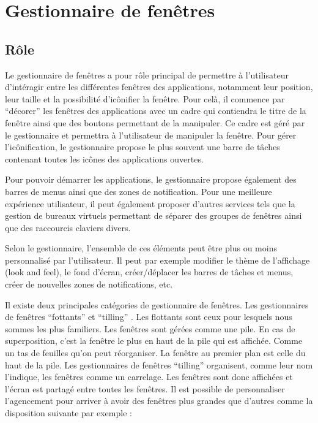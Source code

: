 \section{Gestionnaire de fenêtres}

\subsection{Rôle}

Le gestionnaire de fenêtres a pour rôle principal de permettre à l’utilisateur d’intéragir entre les différentes fenêtres des applications, notamment leur position, leur taille et la possibilité d’icônifier la fenêtre. Pour celà, il commence par “décorer” les fenêtres des applications avec un cadre qui contiendra le titre de la fenêtre ainsi que des boutons permettant de la manipuler. Ce cadre est géré par le gestionnaire et permettra à l’utilisateur de manipuler la fenêtre. Pour gérer l’icônification, le gestionnaire propose le plus souvent une barre de tâches contenant toutes les icônes des applications ouvertes.

Pour pouvoir démarrer les applications, le gestionnaire propose également des barres de menus ainsi que des zones de notification. Pour une meilleure expérience utilisateur, il peut également proposer d’autres services tels que la gestion de bureaux virtuels permettant de séparer des groupes de fenêtres ainsi que des raccourcis claviers divers.

Selon le gestionnaire, l’ensemble de ces éléments peut être plus ou moins personnalisé par l’utilisateur. Il peut par exemple modifier le thème de l’affichage (look and feel), le fond d’écran, créer/déplacer les barres de tâches et menus, créer de nouvelles zones de notifications, etc.

Il existe deux principales catégories de gestionnaire de fenêtres. Les gestionnaires de fenêtres “fottants” et “tilling” \cite{SdzGestionnaireBureau}. Les flottants sont ceux pour lesquels nous sommes les plus familiers. Les fenêtres sont gérées comme une pile. En cas de superposition, c’est la fenêtre le plus en haut de la pile qui est affichée. Comme un tas de feuilles qu’on peut réorganiser. La fenêtre au premier plan est celle du haut de la pile. Les gestionnaires de fenêtres “tilling” organisent, comme leur nom l’indique, les fenêtres comme un carrelage. Les fenêtres sont donc affichées et l’écran est partagé entre toutes les fenêtres. Il est possible de personnaliser l’agencement pour arriver à avoir des fenêtres plus grandes que d’autres comme la disposition suivante par exemple :

